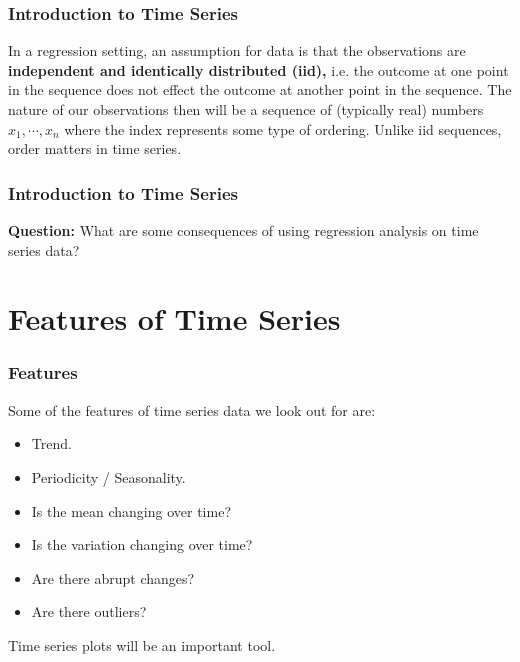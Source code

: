 \documentclass[%
xcolor=pdftex]{beamer}
\begin{document}
\begin{frame}
\frametitle{Introduction to Time Series}

In a regression setting, an assumption for data is that the observations are  \textbf{independent and identically distributed (iid),} i.e. the outcome at one point in the sequence does not effect the outcome at another point in the sequence.  The nature of our observations then will be a sequence of (typically real) numbers $x_1, \cdots,x_n$ where the index represents some type of ordering. Unlike iid sequences, order matters in time series.

\end{frame}

\begin{frame}
\frametitle{Introduction to Time Series}

\textbf{Question:} What are some consequences of using regression analysis on time series data?

\end{frame}





\section{Features of Time Series}
\frame{\tableofcontents[currentsection]}



\begin{frame}
\frametitle{Features}

Some of the features of time series data we look out for are:

\begin{itemize}
\item Trend.
\item Periodicity / Seasonality.
\item Is the mean changing over time?
\item Is the variation changing over time?
\item Are there abrupt changes?
\item Are there outliers?
\end{itemize}

Time series plots will be an important tool.

\end{frame}
\end{document}
